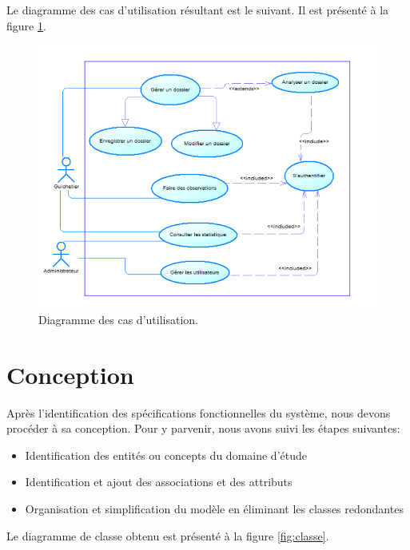 Le diagramme des cas d'utilisation résultant est le suivant. Il est présenté à
la figure \ref{fig:usecase}.

\begin{figure}[h!]
\begin{center}
\includegraphics[width=14cm]
{images/usecase.PNG}
\caption{Diagramme des cas d'utilisation.\label{fig:usecase}}
\end{center}
\end{figure}
%

\section{Conception}

Après l'identification des spécifications fonctionnelles du système, nous devons
procéder à sa conception. Pour y parvenir, nous avons suivi les étapes
suivantes:
\begin{itemize}
  \item Identification des entités ou concepts du domaine d'étude
  \item Identification et ajout des associations et des attributs
  \item Organisation et simplification du modèle en éliminant les classes
    redondantes
\end{itemize}
Le diagramme de classe obtenu est présenté à la figure \ref{fig:classe}.


